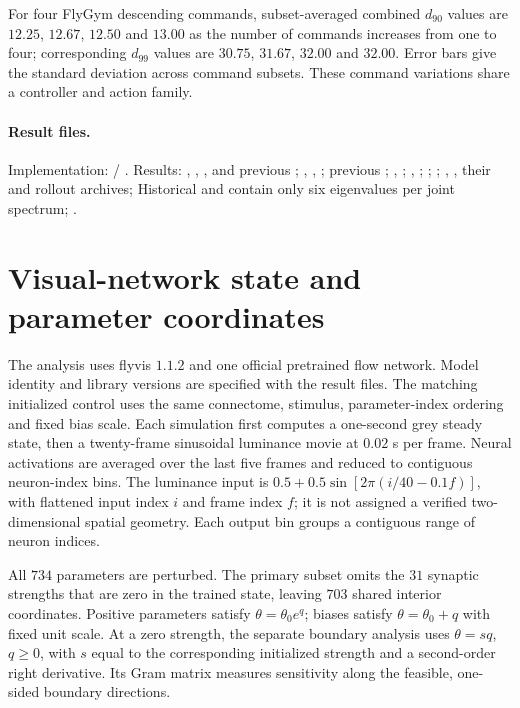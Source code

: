 \documentclass[11pt,letterpaper]{article}
\begin{document}
For four FlyGym descending commands, subset-averaged combined $d_{90}$ values are $12.25$, $12.67$, $12.50$ and $13.00$ as the number of commands increases from one to four; corresponding $d_{99}$ values are $30.75$, $31.67$, $32.00$ and $32.00$. Error bars give the standard deviation across command subsets. These command variations share a controller and action family.

\paragraph{Result files.}
Implementation:  / . Results: , , , and previous ; , , ; previous ; , ; , ; ; ; , , their  and rollout archives; Historical  and  contain only six eigenvalues per joint spectrum; .

\section{Visual-network state and parameter coordinates}
The analysis uses flyvis $1.1.2$ and one official pretrained flow network. Model identity and library versions are specified with the result files. The matching initialized control uses the same connectome, stimulus, parameter-index ordering and fixed bias scale. Each simulation first computes a one-second grey steady state, then a twenty-frame sinusoidal luminance movie at $0.02$ s per frame. Neural activations are averaged over the last five frames and reduced to contiguous neuron-index bins. The luminance input is $0.5+0.5\sin[2\pi(i/40-0.1f)]$, with flattened input index $i$ and frame index $f$; it is not assigned a verified two-dimensional spatial geometry. Each output bin groups a contiguous range of neuron indices.

All $734$ parameters are perturbed. The primary subset omits the $31$ synaptic strengths that are zero in the trained state, leaving $703$ shared interior coordinates. Positive parameters satisfy $\theta=\theta_0e^q$; biases satisfy $\theta=\theta_0+q$ with fixed unit scale. At a zero strength, the separate boundary analysis uses $\theta=sq$, $q\ge0$, with $s$ equal to the corresponding initialized strength and a second-order right derivative. Its Gram matrix measures sensitivity along the feasible, one-sided boundary directions.
\end{document}
